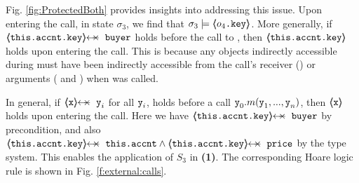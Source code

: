 {{Fig. \ref{fig:ProtectedBoth} provides insights into addressing this issue. Upon entering the call, in state $\sigma_3$, 
we find that $\sigma_3 \models \langle\!\!\langle o_4\mbox{\normalfont{\texttt{.key}}} \rangle\!\!\rangle$. More generally, if $\protectedFrom{\prg{this.\myAccount.key}}{\prg{buyer}}$ holds before the call to , then $\langle\!\!\langle \mbox{\normalfont{\texttt{this.\mbox{\normalfont{\texttt{accnt}}}.key}}} \rangle\!\!\rangle$ holds upon entering the call.
This is because any objects indirectly accessible during  must have been indirectly accessible from the call's
receiver () or  arguments ( and ) when  was called.
 
In general, if   $\protectedFrom{\prg{x}}{\prg{y}_i}$  for all %
 $\mbox{\normalfont{\texttt{y}}}_i$, holds before a call $\mbox{\normalfont{\texttt{y}}}_0.m(\mbox{\normalfont{\texttt{y}}}_1, ..., \mbox{\normalfont{\texttt{y}}}_n)$, then $\langle\!\!\langle \mbox{\normalfont{\texttt{x}}} \rangle\!\!\rangle$ holds  upon entering the call. 
Here we have  $\protectedFrom{\prg{this.accnt.key}}{\prg{buyer}}$ by precondition, and also $\protectedFrom{\prg{this.accnt.key}}{\prg{this.accnt}} \wedge \protectedFrom{\prg{this.accnt.key}}{\prg{price}}$ by the type system.
This enables the application of $S_3$ in \textbf{(1)}. The corresponding Hoare logic rule is shown in Fig. \ref{f:external:calls}.

}}
